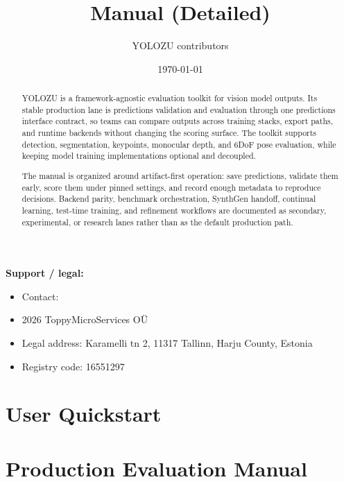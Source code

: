 \documentclass[11pt,a4paper]{report}
\title{\yolozu{} Manual (Detailed)}
\author{YOLOZU contributors}
\date{\today}
\newcommand{\yolozu}{\textsc{YOLOZU}}
\begin{document}
\maketitle

\begin{abstract}
\yolozu{} is a framework-agnostic evaluation toolkit for vision model outputs.
Its stable production lane is predictions validation and evaluation through one
predictions interface contract, so teams can compare outputs across training
stacks, export paths, and runtime backends without changing the scoring
surface. The toolkit supports detection, segmentation, keypoints, monocular
depth, and 6DoF pose evaluation, while keeping model training implementations
optional and decoupled.

The manual is organized around artifact-first operation: save predictions,
validate them early, score them under pinned settings, and record enough
metadata to reproduce decisions. Backend parity, benchmark orchestration,
SynthGen handoff, continual learning, test-time training, and refinement
workflows are documented as secondary, experimental, or research lanes rather
than as the default production path.
\end{abstract}

\noindent\textbf{Support / legal:}
\begin{itemize}
  \item Contact: 
  \item \textcopyright{} 2026 ToppyMicroServices O\"U
  \item Legal address: Karamelli tn 2, 11317 Tallinn, Harju County, Estonia
  \item Registry code: 16551297
\end{itemize}

\tableofcontents

\part{User Quickstart}






\part{Production Evaluation Manual}






\end{document}
